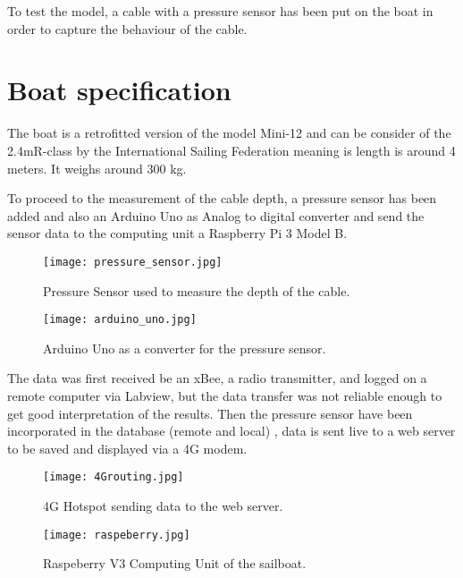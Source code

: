 To test the model, a cable with a pressure sensor has been put on the boat in order to capture the behaviour of the cable.

\section*{Boat specification}

The boat is a retrofitted version of the model Mini-12 and can be consider of the 2.4mR-class by the International Sailing Federation meaning is length is around 4 meters. It weighs around 300 kg.

To proceed to the measurement of the cable depth, a pressure sensor has been added and also an Arduino  Uno as Analog to digital converter and send the sensor data to the computing unit a Raspberry Pi 3 Model B.

\begin{figure}[H]
\centering
    \begin{minipage}[b]{0.4\textwidth}
    \centering
    \texttt{[image: pressure\_sensor.jpg]}
    \caption{Pressure Sensor used to measure the depth of the cable.}
    \label{fig:pressure_sensor}
    \end{minipage}
    \hfill
    \begin{minipage}[b]{0.45\textwidth}
    \centering
    \texttt{[image: arduino\_uno.jpg]}
    \caption{Arduino Uno as a converter for the pressure sensor.}
    \label{fig:arduino_uno}
    \end{minipage}
\end{figure}

The data was first received be an xBee, a radio transmitter, and logged on a remote computer via Labview, but the data transfer was not reliable enough to get good interpretation of the results. Then the pressure sensor have been incorporated in the database (remote and local) , data is sent live to a web server to be saved and displayed via a 4G modem.

\begin{figure}[H]
\centering
    \begin{minipage}[b]{0.4\textwidth}
    \centering
    \texttt{[image: 4Grouting.jpg]}
    \caption{4G Hotspot sending data to the web server.}
    \label{fig:4grouting}
    \end{minipage}
    \hfill
    \begin{minipage}[b]{0.45\textwidth}
    \centering
    \texttt{[image: raspeberry.jpg]}
    \caption{Raspeberry V3 Computing Unit of the sailboat.}
    \label{fig:raspeberry}
    \end{minipage}
\end{figure}

